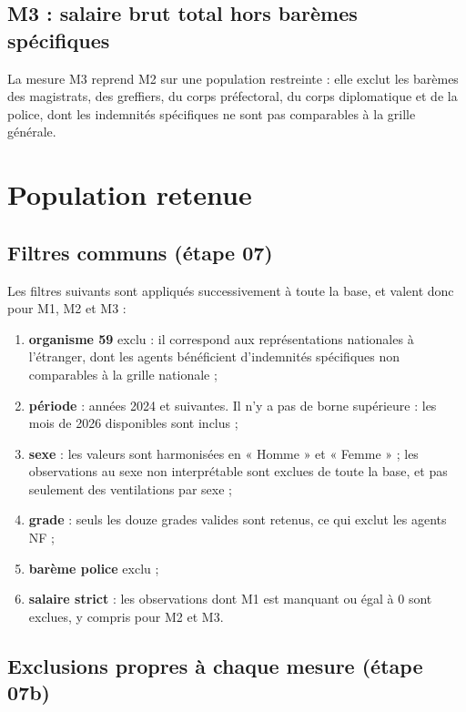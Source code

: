 \documentclass[12pt,a4paper,french]{article}
\renewcommand{\_}{\underscoreorigine\allowbreak}
\begin{document}
\subsection{M3 : salaire brut total hors barèmes spécifiques}

La mesure M3 reprend M2 sur une population restreinte : elle exclut les barèmes des magistrats, des greffiers, du corps préfectoral, du corps diplomatique et de la police, dont les indemnités spécifiques ne sont pas comparables à la grille générale.

\section{Population retenue}\label{sec:population}

\subsection{Filtres communs (étape 07)}

Les filtres suivants sont appliqués successivement à toute la base, et valent donc pour M1, M2 et M3 :

\begin{enumerate}
    \item \textbf{organisme 59} exclu : il correspond aux représentations nationales à l'étranger, dont les agents bénéficient d'indemnités spécifiques non comparables à la grille nationale ;
    \item \textbf{période} : années 2024 et suivantes. Il n'y a pas de borne supérieure : les mois de 2026 disponibles sont inclus ;
    \item \textbf{sexe} : les valeurs sont harmonisées en « Homme » et « Femme » ; les observations au sexe non interprétable sont exclues de toute la base, et pas seulement des ventilations par sexe ;
    \item \textbf{grade} : seuls les douze grades valides sont retenus, ce qui exclut les agents NF ;
    \item \textbf{barème police} exclu ;
    \item \textbf{salaire strict} : les observations dont M1 est manquant ou égal à 0 sont exclues, y compris pour M2 et M3.
\end{enumerate}

\subsection{Exclusions propres à chaque mesure (étape 07b)}
\end{document}
